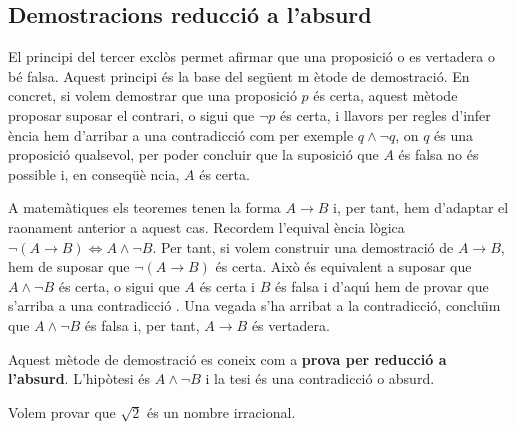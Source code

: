 \subsection{Demostracions reducci\'{o} a l'absurd}

El principi del tercer excl\`{o}s permet afirmar que una proposici\'{o} o es
vertadera o b\'{e} falsa. Aquest principi \'{e}s la base del seg\"{u}ent m%
\`{e}tode de demostraci\'{o}. En concret, si volem demostrar que una
proposici\'{o} $p$ \'{e}s certa, aquest m\`{e}tode proposar suposar el
contrari, o sigui que $\lnot p$ \'{e}s certa, i llavors per regles d'infer%
\`{e}ncia hem d'arribar a una contradicci\'{o} com per exemple $q\wedge\lnot
q$, on $q$ \'{e}s una proposici\'{o} qualsevol, per poder concluir que la
suposici\'{o} que $A$ \'{e}s falsa no \'{e}s possible i, en conseq\"{u}\`{e}%
ncia, $A$ \'{e}s certa.

A matem\`{a}tiques els teoremes tenen la forma $A\longrightarrow B$ i, per
tant, hem d'adaptar el raonament anterior a aquest cas. Recordem l'equival%
\`{e}ncia l\`{o}gica $\lnot\left( A\longrightarrow B\right)
\Longleftrightarrow A\wedge\lnot B$. Per tant, si volem construir una
demostraci\'{o} de $A\longrightarrow B$, hem de suposar que $\lnot\left(
A\longrightarrow B\right) $ \'{e}s certa. Aix\`{o} \'{e}s equivalent a
suposar que $A\wedge\lnot B$ \'{e}s certa, o sigui que $A$ \'{e}s certa i $B$
\'{e}s falsa i d'aqu\'{\i} hem de provar que s'arriba a una contradicci\'{o}%
. Una vegada s'ha arribat a la contradicci\'{o}, conclu\"{\i}m que $%
A\wedge\lnot B$ \'{e}s falsa i, per tant, $A\longrightarrow B$ \'{e}s
vertadera.

Aquest m\`{e}tode de demostraci\'{o} es coneix com a \textbf{prova per
reducci\'{o} a l'absurd}. L'hip\`{o}tesi \'{e}s $A\wedge\lnot B$ i la tesi
\'{e}s una contradicci\'{o} o absurd.

\begin{exem}
Volem provar que $\sqrt{2}$ \'{e}s un nombre irracional.
\end{exem}


